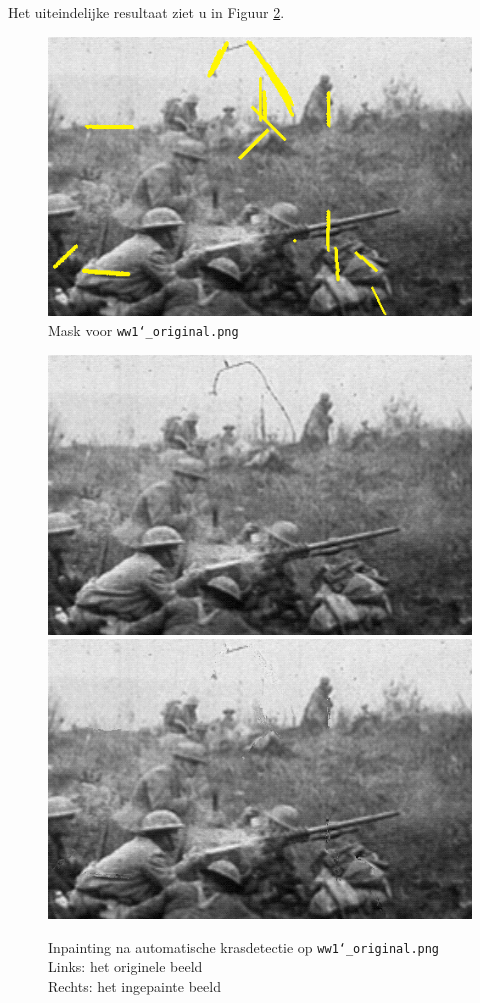 \documentclass[titlepage]{article}
\begin{document}
Het uiteindelijke resultaat ziet u in Figuur \ref{fig:result_ww1}.

\begin{figure}[!ht]
  \centering
  \includegraphics[width=.9\textwidth]{ww1_mask}
  \caption{Mask voor \texttt{ww1\char`_original.png}} \label{fig:mask}
\end{figure}

\begin{figure}[!ht]
  \centering
  \captionsetup{justification=centering}
  \includegraphics[width=.45\textwidth]{ww1_original}\quad
  \includegraphics[width=.45\textwidth]{ww1_inpainted}  \caption{Inpainting na automatische krasdetectie op \texttt{ww1\char`_original.png}\\Links: het originele beeld\\Rechts: het ingepainte beeld} \label{fig:result_ww1}
\end{figure}
\FloatBarrier
\end{document}
